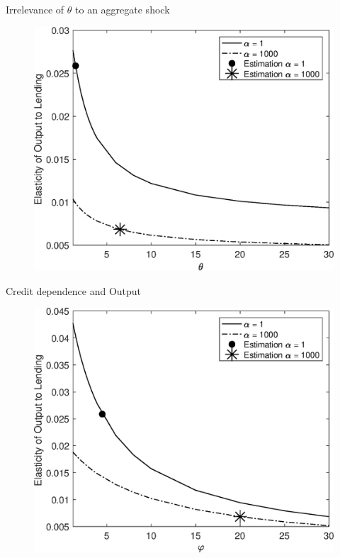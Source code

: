 \documentclass[english,xcolor=svgnames]{beamer}
\begin{document}
\begin{frame}{Irrelevance of $\theta$ to an aggregate shock}
\begin{figure}
\includegraphics[scale=0.5]{Figures/output_loop_theta_id.eps}
\end{figure}
\end{frame}



\begin{frame}{Credit dependence and Output}
\begin{figure}
\includegraphics[scale=0.5]{Figures/output_loop_varpsi_id.eps}
\end{figure}
\end{frame}
\end{document}
